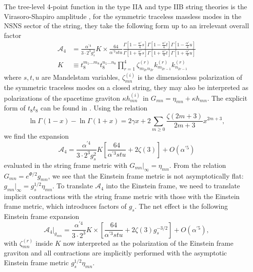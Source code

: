 The tree-level 4-point function in the type IIA and type IIB string theories is the Virasoro-Shapiro amplitude \cite{Green:2012oqa}, for the symmetric traceless massless modes in the NSNS sector of the string, they take the following form \cite{Green:1999pv} up to an irrelevant overall factor
\begin{equation}
\begin{aligned}
\mathcal A_4
&=\frac{\alpha^{\prime 4}}{3\cdot 2^3 g_s^2}
K
\times\frac{64}{\alpha^{\prime 3}stu}
\frac{\Gamma[1-\tfrac{\alpha'}{4}s]\Gamma[1-\tfrac{\alpha'}{4}t]\Gamma[1-\tfrac{\alpha'}{4}u]}{\Gamma[1+\tfrac{\alpha'}{4}s]\Gamma[1+\tfrac{\alpha'}{4}t]\Gamma[1+\tfrac{\alpha'}{4}u]}\\
K &\equiv t_8^{m_1...m_8}t_8^{n_1...n_8}               
\prod_{r=1}^4\zeta^{(r)}_{m_{2r}n_{2r}}k^{(r)}_{m_{2r-1}}k^{(r)}_{n_{2r-1}}
\end{aligned}
\end{equation}
where $s,t,u$ are Mandelstam variables, $\zeta^{(i)}_{mn}$ is the dimensionless polarization of the symmetric traceless modes on a closed string, they may also be interpreted as polarizations of the spacetime graviton $\kappa h^{(i)}_{mn}$ in $G_{mn}=\eta_{mn} + \kappa h_{mn}$. 
The explicit form of $t_8 t_8$ can be found in \cite{Schwarz:1982jn,Policastro:2008hg,Liu:2025uqu}.
Using the relation
\begin{equation}
\ln\Gamma(1-x)-\ln\Gamma(1+x) = 2\gamma x + 2\sum_{m\ge0}\frac{\zeta(2m+3)}{2m+3}x^{2m+3},
\end{equation}
we find the expansion
\begin{equation}
\mathcal{A}_4 = \frac{\alpha^{\prime 4}}{3\cdot 2^3 g_s^2}
K
\left[ \frac{64}{\alpha^{\prime 3}stu} + 2 \zeta(3)\right]
 + O(\alpha^{\prime 5})
\end{equation}
evaluated in the string frame metric with $G_{mn} |_{\infty} = \eta_{mn}$.
From the relation $G_{mn} = e^{\Phi/2}g_{mn}$, we see that the Einstein frame metric is not asymptotically flat: $g_{mn} |_{\infty} = g_s^{1/2}\eta_{mn}$.
To translate $\mathcal{A}_4$ into the Einstein frame, we need to translate implicit contractions with the string frame metric with those with the Einstein frame metric, which introduces factors of $g_s$.
The net effect is the following Einstein frame expansion
\begin{equation}
\mathcal{A}_4 \bigg|_{g_{mn}} = 
\frac{\alpha^{\prime 4}}{3\cdot 2^3 }
K
\times
\left[ \frac{64}{\alpha^{\prime 3}stu} + 2 \zeta(3)g_s^{-3/2}\right]
 + O(\alpha^{\prime 5}),
\end{equation}
with $\zeta_{mn}^{(r)}$ inside $K$ now interpreted as the polarization of the Einstein frame graviton and all contractions are implicitly performed with the asymptotic Einstein frame metric $g_s^{1/2}\eta_{mn}$.

